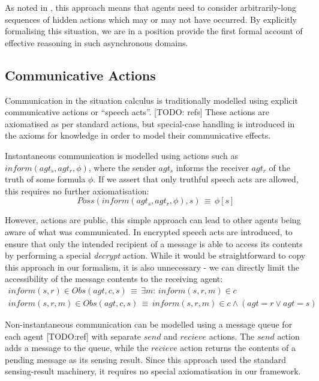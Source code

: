 As noted in \citep{Lesperance99sitcalc_approach}, this approach means
that agents need to consider arbitrarily-long sequences of hidden
actions which may or may not have occurred. By explicitly formalising
this situation, we are in a position provide the first formal account
of effective reasoning in such asynchronous domains.


\subsection{Communicative Actions}

Communication in the situation calculus is traditionally modelled
using explicit communicative actions or {}``speech acts''. {[}TODO:
refs] These actions are axiomatised as per standard actions, but special-case
handling is introduced in the axioms for knowledge in order to model
their communicative effects.

Instantaneous communication is modelled using actions such as $inform(agt_{s},agt_{r},\phi)$,
where the sender $agt_{s}$ informs the receiver $agt_{r}$ of the
truth of some formula $\phi$. If we assert that only truthful speech
acts are allowed, this requires no further axiomatisation:\[
Poss(inform(agt_{s},agt_{r},\phi),s)\,\equiv\,\phi[s]\]


However, actions are public, this simple approach can lead to other
agents being aware of what was communicated. In \citep{shapiro01casl_feat_inter}
encrypted speech acts are introduced, to ensure that only the intended
recipient of a message is able to access its contents by performing
a special \emph{decrypt} action. While it would be straightforward
to copy this approach in our formalism, it is also unnecessary - we
can directly limit the accessibility of the message contents to the
receiving agent:\begin{gather*}
inform(s,r)\in Obs(agt,c,s)\,\equiv\,\exists m:\, inform(s,r,m)\in c\\
inform(s,r,m)\in Obs(agt,c,s)\,\equiv\, inform(s,r,m)\in c\wedge\left(agt=r\vee agt=s\right)\end{gather*}


Non-instantaneous communication can be modelled using a message queue
for each agent {[}TODO:ref] with separate $send$ and $recieve$ actions.
The $send$ action adds a message to the queue, while the $recieve$
action returns the contents of a pending message as its sensing result.
Since this approach used the standard sensing-result machinery, it
requires no special axiomatisation in our framework.


